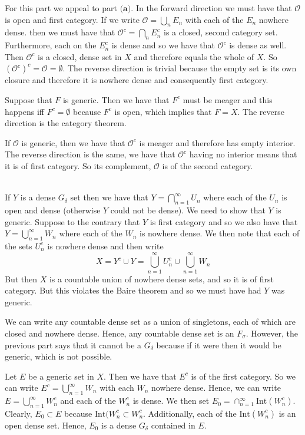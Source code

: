 \documentclass[6pt]{article}
\newcommand{\problem}[1]{\noindent{\textbf{Problem #1}}\\}
\newcommand{\problempart}[1]{\noindent{\textbf{(#1)}}}
\begin{document}
\problempart{b} For this part we appeal to part $\textbf{(a)}$. In the forward direction we must have that $\mathcal{O}$ is open and first category. If we write $\mathcal{O} = \bigcup_n E_n$ with each of the $E_n$ nowhere dense. then we must have that $\mathcal{O}^c = \bigcap_n E_n^c$ is a closed, second category set. Furthermore, each on the $E_n^c$ is dense and so we have that $\mathcal{O}^c$ is dense as well. Then $\mathcal{O}^c$ is a closed, dense set in $X$ and therefore equals the whole of $X$. So $(\mathcal{O}^c)^c = \mathcal{O} = \emptyset$. The reverse direction is trivial because the empty set is its own closure and therefore it is nowhere dense and consequently first category. 

\problempart{c} Suppose that $F$ is generic. Then we have that $F^c$ must be meager and this happens iff $F^c = \emptyset$ because $F^c$ is open, which implies that $F = X$. The reverse direction is the category theorem. 

If $\mathcal{O}$ is generic, then we have that $\mathcal{O}^c$ is meager and therefore has empty interior. The reverse direction is the same, we have that $\mathcal{O}^c$ having no interior means that it is of first category. So its complement, $\mathcal{O}$ is of the second category. 

\problem{4.6.5}
\problempart{a} If $Y$ is a dense $G_\delta$ set then we have that $Y = \bigcap_{n=1}^\infty U_n$ where each of the $U_n$ is open and dense (otherwise $Y$ could not be dense). We need to show that $Y$ is generic. Suppose to the contrary that $Y$ is first category and so we also have that $Y = \bigcup_{n=1}^\infty W_n$ where each of the $W_n$ is nowhere dense. We then note that each of the sets $U_n^c$ is nowhere dense and then write
\[
X = Y^c \cup Y = \bigcup_{n=1}^\infty U_n^c \cup \bigcup_{n=1}^\infty W_n
\] 
But then $X$ is a countable union of nowhere dense sets, and so it is of first category. But this violates the Baire theorem and so we must have had $Y$ was generic. 

\problempart{b} We can write any countable dense set as a union of singletons, each of which are closed and nowhere dense. Hence, any countable dense set is an $F_\sigma$. However, the previous part says that it cannot be a $G_\delta$ because if it were then it would be generic, which is not possible. 

\problempart{c} Let $E$ be a generic set in $X$. Then we have that $E^c$ is of the first category. So we can write $E^c = \bigcup_{n=1}^\infty W_n$ with each $W_n$ nowhere dense. Hence, we can write $E = \bigcup_{n=1}^\infty W_n^c$ and each of the $W_n^c$ is dense. We then set $E_0 = \cap_{n=1}^\infty \text{Int}(W_n^c)$. Clearly, $E_0 \subset E$ because $\text{Int}(W_n^c \subset W_n^c$. Additionally, each of the $\text{Int}(W_n^c)$ is an open dense set. Hence, $E_0$ is a dense $G_\delta$ contained in $E$.
\end{document}
